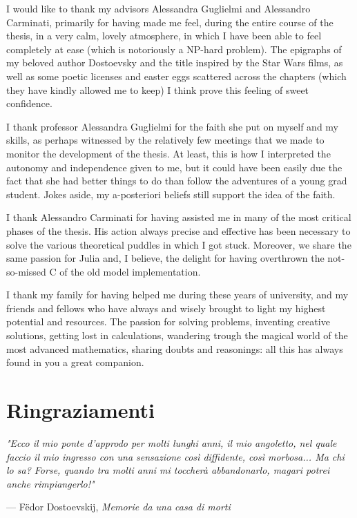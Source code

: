 \documentclass[12pt,	%
	a4paper,		%
	twoside,		%
	openright,		%
	titlepage,%
	]{book}
\theoremstyle{definition}
\begin{document}
I would like to thank my advisors Alessandra Guglielmi and Alessandro Carminati, primarily for having made me feel, during the entire course of the thesis, in a very calm, lovely atmosphere, in which I have been able to feel completely at ease (which is notoriously a NP-hard problem). The epigraphs of my beloved author Dostoevsky and the title inspired by the Star Wars films, as well as some poetic licenses and easter eggs scattered across the chapters (which they have kindly allowed me to keep) I think prove this feeling of sweet confidence.

I thank professor Alessandra Guglielmi for the faith she put on myself and my skills, as perhaps witnessed by the relatively few meetings that we made to monitor the development of the thesis. At least, this is how I interpreted the autonomy and independence given to me, but it could have been easily due the fact that she had better things to do than follow the adventures of a young grad student. Jokes aside, my a-posteriori beliefs still support the idea of the faith.

I thank Alessandro Carminati for having assisted me in many of the most critical phases of the thesis. His action always precise and effective has been necessary to solve the various theoretical puddles in which I got stuck. Moreover, we share the same passion for Julia and, I believe, the delight for having overthrown the not-so-missed C of the old model implementation.

I thank my family for having helped me during these years of university, and my friends and fellows who have always and wisely brought to light my highest potential and resources. The passion for solving problems, inventing creative solutions, getting lost in calculations, wandering trough the magical world of the most advanced mathematics, sharing doubts and reasonings: all this has always found in you a great companion.


\cleardoublepage
\chapter*{Ringraziamenti}

\setlength{}
\epigraph{\itshape 
"Ecco il mio ponte d'approdo per molti lunghi anni, il mio angoletto, nel quale faccio il mio ingresso con una sensazione così diffidente, così morbosa... Ma chi lo sa? Forse, quando tra molti anni mi toccherà abbandonarlo, magari potrei anche rimpiangerlo!"}
{--- F\"{e}dor Dostoevskij, \textit{Memorie da una casa di morti}}
\setlength{}
\end{document}
